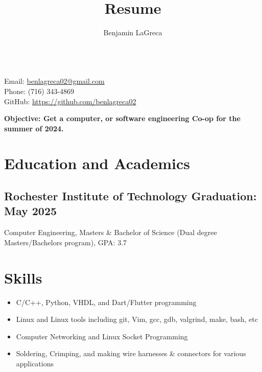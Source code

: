 \documentclass{article}
\title{Resume}
\author{Benjamin LaGreca}
\begin{document}
\begin{center}
    {\Huge\bfseries\underline{\theauthor}} \\
    \vspace{.75em}
    Email: \url{benlagreca02@gmail.com} \\
    Phone: (716) 343-4869 \\
    GitHub: \url{https://github.com/benlagreca02}
    \vspace{.25em}
    
    \bfseries Objective: Get a computer, or software engineering Co-op for the 
    summer of 2024.
\end{center}

\vspace{-1em}

\section{Education and Academics}

    \subsection{Rochester Institute of Technology \hfill Graduation: May 2025}
    Computer Engineering, Masters \& Bachelor of Science (Dual degree Masters/Bachelors 
    program), GPA: 3.7

\section {Skills}
    \begin{itemize}[noitemsep]
        \item
            C/C++, Python, VHDL, and Dart/Flutter programming
        \item
            Linux and Linux tools including git, Vim, gcc, gdb, valgrind, make,
            bash, etc
        \item
            Computer Networking and Linux Socket Programming
        \item
            Soldering, Crimping, and making wire harnesses \& connectors for various 
            applications
    \end{itemize}
\end{document}
